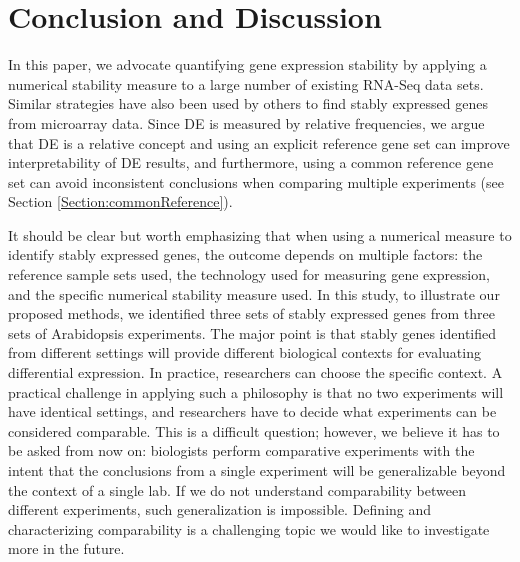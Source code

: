 \documentclass[letterpaper,12pt]{article}
\begin{document}
  \section{Conclusion and Discussion}\label{section:discussion}
  
In this paper, we advocate quantifying gene expression stability by applying a
numerical stability measure to a large number of existing RNA-Seq data sets.
Similar strategies have also been used by others to find stably expressed
genes from microarray data. Since DE is measured by relative frequencies, we
argue that DE is a relative concept and using an explicit reference gene set
can improve interpretability of DE results, and furthermore,  using a common
reference gene set can avoid inconsistent conclusions when comparing multiple
experiments (see Section \ref{Section:commonReference}).



It should be clear but worth emphasizing that when using a numerical measure
to identify stably expressed genes, the outcome depends on multiple factors:
the reference sample sets used, the technology used for measuring gene
expression, and the specific numerical stability measure used.  In this study,
to illustrate our proposed methods, we identified three sets of stably expressed
genes from three sets of Arabidopsis experiments. The major point is that
stably genes identified from different settings will provide different
biological contexts for evaluating differential expression. In practice,
researchers can choose the specific context. A practical challenge in applying
such a philosophy is that no two experiments will have identical settings,
and researchers have to decide what experiments can be considered comparable. This
is a difficult question; however, we believe it has to be asked from now on:
biologists perform comparative experiments with the intent that the
conclusions from a single experiment will be generalizable beyond the context
of a single lab. If we do not understand comparability between different
experiments, such generalization is impossible. Defining and characterizing
comparability is a challenging topic we would like to investigate more in the
future.
\end{document}
